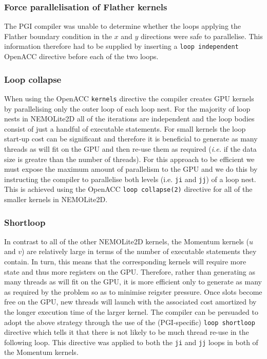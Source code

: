\documentclass[gmd, manuscript]{copernicus}
\begin{document}
\subsubsection{Force parallelisation of Flather kernels}

The PGI compiler was unable to determine whether the loops applying
the Flather boundary condition in the $x$ and $y$ directions were safe
to parallelise. This information therefore had to be supplied by
inserting a \texttt{loop independent} OpenACC directive before each of
the two loops.

\subsubsection{Loop collapse}

When using the OpenACC \texttt{kernels} directive the compiler creates
GPU kernels by parallelising only the outer loop of each loop nest.
For the majority of loop nests in NEMOLite2D all of the iterations are
independent and the loop bodies consist of just a handful of
executable statements. For small kernels the loop start-up cost can be
significant and therefore it is beneficial to generate as many threads
as will fit on the GPU and then re-use them as required (\textit{i.e.} if the
data size is greatre than the number of threads). For this approach to
be efficient we must expose the maximum amount of parallelism to the
GPU and we do this by instructing the compiler to parallelise both
levels (i.e. \texttt{ji} and \texttt{jj}) of a loop nest. This is
achieved using the OpenACC \texttt{loop collapse(2)} directive for all
of the smaller kernels in NEMOLite2D.

\subsubsection{Shortloop}

In contrast to all of the other NEMOLite2D kernels, the Momentum
kernels ($u$ and $v$) are relatively large in terms of the number of
executable statements they contain. In turn, this means that the
corresponding kernels will require more state and thus more registers
on the GPU. Therefore, rather than generating as many threads as will
fit on the GPU, it is more efficient only to generate as many as
required by the problem so as to minimise reigster pressure. Once
slots become free on the GPU, new threads will launch with the
associated cost amortized by the longer execution time of the larger
kernel. The compiler can be persuaded
to adopt the above strategy through the use of the (PGI-specific)
\texttt{loop shortloop} directive which tells it that there is not
likely to be much thread re-use in the following loop. This directive
was applied to both the \texttt{ji} and \texttt{jj} loops in both of
the Momentum kernels.
\end{document}
